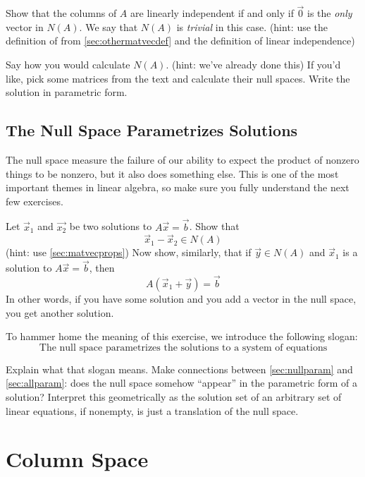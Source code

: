 \begin{Ex}
  Show that the columns of $A$ are linearly independent if and only if $\vec{0}$ is the \emph{only} vector in $N(A)$.
  We say that $N(A)$ is \emph{trivial} in this case.  
  (hint: use the definition of from \ref{sec:othermatvecdef} and the definition of linear independence)
\end{Ex}
\begin{EasyEx}
  Say how you would calculate $N(A)$.  (hint: we've already done this)
  If you'd like, pick some matrices from the text and calculate their null spaces.  
  Write the solution in parametric form.  
\end{EasyEx}

\subsection{The Null Space Parametrizes Solutions}

The null space measure the failure of our ability to expect the product of nonzero things to be nonzero, but it also does something else.  
This is one of the most important themes in linear algebra, so make sure you fully understand the next few exercises.  
\begin{ImpEx}
  \label{sec:nullparam}
  Let $\vec{x}_1$ and $\vec{x_2}$ be two solutions to $A\vec{x}=\vec{b}$.
  Show that 
  \[\vec{x}_1 - \vec{x}_2 \in N(A)\]
  (hint: use \ref{sec:matvecprops})
  Now show, similarly, that if $\vec{y}\in N(A)$ and $\vec{x}_1$ is a solution to $A\vec{x}=\vec{b}$, then 
  \[A(\vec{x}_1+\vec{y})=\vec{b}\]
  In other words, if you have some solution and you add a vector in the null space, you get another solution.  
\end{ImpEx}
To hammer home the meaning of this exercise, we introduce the following slogan: 
\[\mbox{The null space parametrizes the solutions to a system of equations}\]
\begin{ImpEx}
  Explain what that slogan means.  
  Make connections between \ref{sec:nullparam} and \ref{sec:allparam}: does the null space somehow ``appear'' in the parametric form of a solution? 
  Interpret this geometrically as the solution set of an arbitrary set of linear equations, if nonempty, is just a translation of the null space.  
\end{ImpEx}
 
\exersisesh

\section{Column Space}

